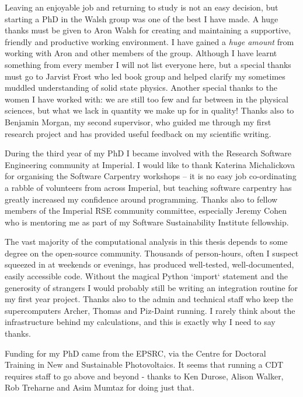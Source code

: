 Leaving an enjoyable job and returning to study is not an easy decision, but starting a PhD in the Walsh group was one of the best I have made. A huge thanks must be given to Aron Walsh for creating and maintaining a supportive, friendly and productive working environment. I have gained a \textit{huge amount} from working with Aron and other members of the group. Although I have learnt something from every member I will not list everyone here, but a special thanks must go to Jarvist Frost who led book group and helped clarify my sometimes muddled understanding of solid state physics. Another special thanks to the women I have worked with: we are still too few and far between in the physical sciences, but what we lack in quantity we make up for in quality! Thanks also to Benjamin Morgan, my second supervisor, who guided me through my first research project and has provided useful feedback on my scientific writing. 

During the third year of my PhD I became involved with the Research Software Engineering community at Imperial. I would like to thank Katerina Michalickova for organising the Software Carpentry workshops -- it is no easy job co-ordinating a rabble of volunteers from across Imperial, but teaching software carpentry has greatly increased my confidence around programming. Thanks also to fellow members of the Imperial RSE community committee, especially Jeremy Cohen who is mentoring me as part of my Software Sustainability Institute fellowship.

The vast majority of the computational analysis in this thesis depends to some degree on the open-source community. Thousands of person-hours, often I suspect squeezed in at weekends or evenings, has produced well-tested, well-documented, easily accessible code. Without the magical Python `import` statement and the generosity of strangers I would probably still be writing an integration routine for my first year project. Thanks also to the admin and technical staff who keep the supercomputers Archer, Thomas and Piz-Daint running. I rarely think about the infrastructure behind my calculations, and this is exactly why I need to say thanks.

Funding for my PhD came from the EPSRC, via the Centre for Doctoral Training in New and Sustainable Photovoltaics. It seems that running a CDT requires staff to go above and beyond - thanks to Ken Durose, Alison Walker, Rob Treharne and Asim Mumtaz for doing just that.

